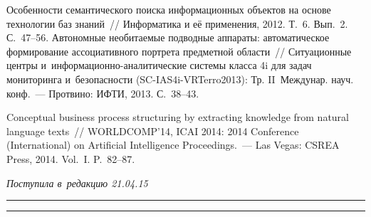 \begin{multicols}{2}
{{\begin{thebibliography}{99}
 Особенности семантического поиска
информационных объектов на основе технологии баз знаний~// Информатика
и её применения, 2012. Т.~6. Вып.~2. С.~47--56.
 Автономные необитаемые подводные аппараты:
автоматическое формирование ассоциативного портрета предметной
об\-ласти~// Ситуационные центры
и~ин\-фор\-ма\-ци\-он\-но-ана\-ли\-ти\-че\-ские системы класса 4i для задач
мониторинга и~без\-опас\-ности (SC-IAS4i-VRTerro2013): Тр. II~Междунар.
науч. конф.~--- Протвино: ИФТИ, 2013. С.~38--43.

 Conceptual business process
structuring by extracting knowledge from natural language texts~//
WORLDCOMP'14, ICAI 2014: 2014 Conference (International) on Artificial
Intelligence Proceedings.~--- Las Vegas: CSREA Press, 2014. Vol.~I. P.~82--87.

 \end{thebibliography}

 }
 }

\end{multicols}

\vspace*{-4pt}

\hfill{\small\textit{Поступила в~редакцию 21.04.15}}


\vspace*{6pt}

\hrule

\vspace*{2pt}

\hrule


\def\tit{ASSOCIATIVE PORTRAITS OF SUBJECT AREAS AS~A~TOOL FOR~AUTOMATED
CONSTRUCTION OF~BIG DATA SYSTEMS FOR~KNOWLEDGE EXTRACTION: THEORY,
METHODS, VISUALIZATION, AND~APPLICATION}

\def\titkol{Associative portraits of subject areas as a tool for automated
construction of big data systems for knowledge extraction} %

\def\aut{I.\,V.~Galina, E.\,B.~Kozerenko, Yu.\,I.~Morozova, N.\,V.~Somin,
and~M.\,M.~Charnine}

\def\autkol{I.\,V.~Galina, E.\,B.~Kozerenko, Yu.\,I.~Morozova, et al.}


